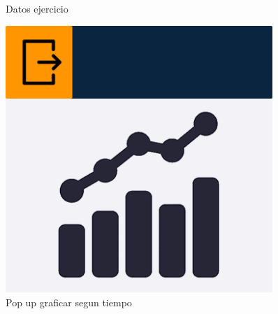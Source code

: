 \begin{figure}[H]
\begin{minipage}{0.45\textwidth}
      \caption{Datos ejercicio}
      \label{fig:Datos ejercicio}
   \end{minipage}%
   \hspace{0.5cm}
   \begin{minipage}{0.45\textwidth}
      \centering
      \includegraphics[width=0.9\textwidth]{fotos/Frame 43.png}
      \caption{Pop up graficar segun tiempo}
      \label{fig:Pop up graficar segun tiempo}
   \end{minipage}
\end{figure}

